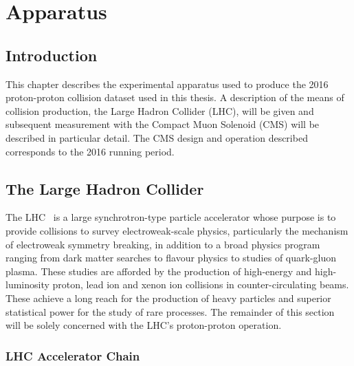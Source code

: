 
\chapter{Apparatus}
\label{chap:apparatus}



\section{Introduction}
This chapter describes the experimental apparatus used to produce the 2016 proton-proton collision dataset used in this thesis. A description of the means of collision production, the Large Hadron Collider (LHC), will be given and subsequent measurement with the Compact Muon Solenoid (CMS) will be described in particular detail. The CMS design and operation described corresponds to the 2016 running period.

\section{The Large Hadron Collider}
The LHC~\cite{LHC_design_report} is a large synchrotron-type particle accelerator whose purpose is to provide collisions to survey electroweak-scale physics, particularly the mechanism of electroweak symmetry breaking, in addition to a broad physics program ranging from dark matter searches to flavour physics to studies of quark-gluon plasma.
These studies are afforded by the production of high-energy and high-luminosity proton, lead ion and xenon ion collisions in counter-circulating beams. These achieve a long reach for the production of heavy particles and superior statistical power for the study of rare processes. 
The remainder of this section will be solely concerned with the LHC's proton-proton operation.  

\subsection{LHC Accelerator Chain}

